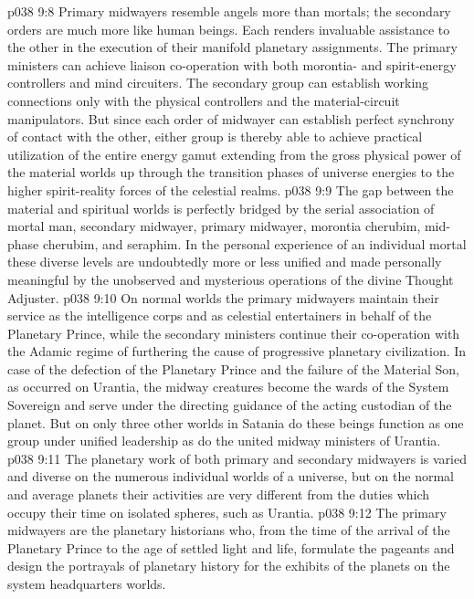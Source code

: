 \vs p038 9:8 Primary midwayers resemble angels more than mortals; the secondary orders are much more like human beings. Each renders invaluable assistance to the other in the execution of their manifold planetary assignments. The primary ministers can achieve liaison co\hyp{}operation with both morontia\hyp{} and spirit\hyp{}energy controllers and mind circuiters. The secondary group can establish working connections only with the physical controllers and the material\hyp{}circuit manipulators. But since each order of midwayer can establish perfect synchrony of contact with the other, either group is thereby able to achieve practical utilization of the entire energy gamut extending from the gross physical power of the material worlds up through the transition phases of universe energies to the higher spirit\hyp{}reality forces of the celestial realms.
\vs p038 9:9 The gap between the material and spiritual worlds is perfectly bridged by the serial association of mortal man, secondary midwayer, primary midwayer, morontia cherubim, mid\hyp{}phase cherubim, and seraphim. In the personal experience of an individual mortal these diverse levels are undoubtedly more or less unified and made personally meaningful by the unobserved and mysterious operations of the divine Thought Adjuster.
\pc \vs p038 9:10 On normal worlds the primary midwayers maintain their service as the intelligence corps and as celestial entertainers in behalf of the Planetary Prince, while the secondary ministers continue their co\hyp{}operation with the Adamic regime of furthering the cause of progressive planetary civilization. In case of the defection of the Planetary Prince and the failure of the Material Son, as occurred on Urantia, the midway creatures become the wards of the System Sovereign and serve under the directing guidance of the acting custodian of the planet. But on only three other worlds in Satania do these beings function as one group under unified leadership as do the united midway ministers of Urantia.
\vs p038 9:11 The planetary work of both primary and secondary midwayers is varied and diverse on the numerous individual worlds of a universe, but on the normal and average planets their activities are very different from the duties which occupy their time on isolated spheres, such as Urantia.
\vs p038 9:12 The primary midwayers are the planetary historians who, from the time of the arrival of the Planetary Prince to the age of settled light and life, formulate the pageants and design the portrayals of planetary history for the exhibits of the planets on the system headquarters worlds.
